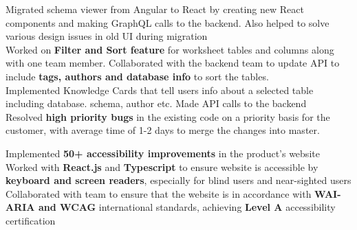 \documentclass[]{Nikhil_Kadiyan_Resume}
\begin{document}
\pt Migrated schema viewer from Angular to React by creating new React components and making GraphQL calls to the backend. Also helped to solve various design issues in old UI during migration\\
\pt Worked on \textbf{Filter and Sort feature} for worksheet tables and columns along with one team member. Collaborated with the backend team to update API to include \textbf{tags, authors and database info} to sort the tables.\\
\pt Implemented Knowledge Cards that tell users info about a selected table including database. schema, author etc. Made API calls to the backend\\
\pt Resolved \textbf{high priority bugs} in the existing code on a priority basis for the customer, with average time of 1-2 days to merge the changes into master. \\
\sectionsep

\pt Implemented \textbf{50+ accessibility improvements} in the product's website\\
\pt Worked with \textbf{React.js} and \textbf{Typescript} to ensure website is accessible by \textbf{keyboard and screen readers}, especially for blind users and near-sighted users\\
\pt Collaborated with team to ensure that the website is in accordance with \textbf{WAI-ARIA and WCAG} international standards, achieving \textbf{Level A}  accessibility certification\\
\sectionsep


\end{document}
